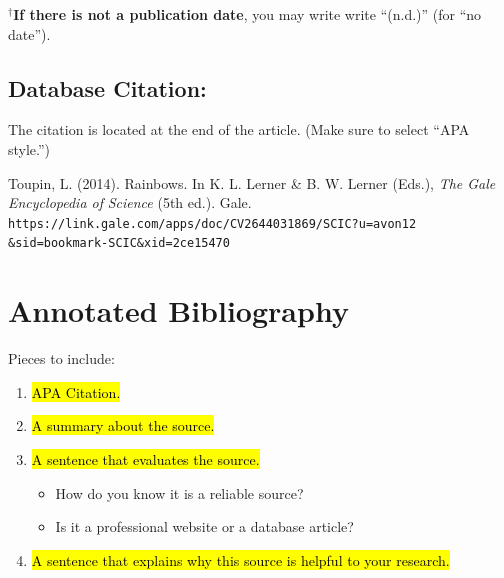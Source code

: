 \documentclass[10pt]{exam}
\begin{document}
\vspace{1em}


$^\dagger$\textbf{If there is not a publication date}, you may write write ``{\color{purple}(n.d.)}'' (for ``no date'').

\vspace{1em}


\subsection*{Database Citation:}

\begin{mycitation}
  The citation is located at the end of the article. (Make sure to select ``APA style.'')    
\end{mycitation}


\vspace{1em}

\begin{examplecitation}
  \raggedright
  Toupin, L. (2014). Rainbows. In K. L. Lerner \& B. W. Lerner (Eds.), \emph{The Gale Encyclopedia of} \emph{Science} (5th ed.). Gale. \texttt{https://link.gale.com/apps/doc/CV2644031869/SCIC?u=avon12 \&sid=bookmark-SCIC\&xid=2ce15470}
\end{examplecitation}


\pagebreak

\section*{Annotated Bibliography}

Pieces to include: 

\begin{enumerate}
  \item {} \hl{APA Citation.}
  \item {} \hl{A summary about the source. }
  \item {} \hl{A sentence that evaluates the source. }
  \begin{itemize}[topsep=-2ex,itemsep=-1ex,partopsep=1ex,parsep=1ex]
    \item How do you know it is a reliable source? 
    \item Is it a professional website or a database article? \vspace{0.5em}
  \end{itemize}
  \item {} \hl{A sentence that explains why this source is helpful to your research.}
\end{enumerate}
\end{document}
